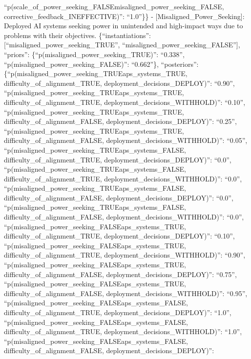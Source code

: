 \documentclass[
  11pt,
  letterpaper,
]{book}
\begin{document}
``p(scale\_of\_power\_seeking\_FALSE\textbar misaligned\_power\_seeking\_FALSE,
corrective\_feedback\_INEFFECTIVE)'': ``1.0''\}\} -
{[}Misaligned\_Power\_Seeking{]}: Deployed AI systems seeking power in
unintended and high-impact ways due to problems with their objectives.
\{``instantiations'': {[}``misaligned\_power\_seeking\_TRUE'',
``misaligned\_power\_seeking\_FALSE''{]}, ``priors'':
\{``p(misaligned\_power\_seeking\_TRUE)'': ``0.338'',
``p(misaligned\_power\_seeking\_FALSE)'': ``0.662''\}, ``posteriors'':
\{``p(misaligned\_power\_seeking\_TRUE\textbar aps\_systems\_TRUE,
difficulty\_of\_alignment\_TRUE, deployment\_decisions\_DEPLOY)'':
``0.90'',
``p(misaligned\_power\_seeking\_TRUE\textbar aps\_systems\_TRUE,
difficulty\_of\_alignment\_TRUE, deployment\_decisions\_WITHHOLD)'':
``0.10'',
``p(misaligned\_power\_seeking\_TRUE\textbar aps\_systems\_TRUE,
difficulty\_of\_alignment\_FALSE, deployment\_decisions\_DEPLOY)'':
``0.25'',
``p(misaligned\_power\_seeking\_TRUE\textbar aps\_systems\_TRUE,
difficulty\_of\_alignment\_FALSE, deployment\_decisions\_WITHHOLD)'':
``0.05'',
``p(misaligned\_power\_seeking\_TRUE\textbar aps\_systems\_FALSE,
difficulty\_of\_alignment\_TRUE, deployment\_decisions\_DEPLOY)'':
``0.0'',
``p(misaligned\_power\_seeking\_TRUE\textbar aps\_systems\_FALSE,
difficulty\_of\_alignment\_TRUE, deployment\_decisions\_WITHHOLD)'':
``0.0'',
``p(misaligned\_power\_seeking\_TRUE\textbar aps\_systems\_FALSE,
difficulty\_of\_alignment\_FALSE, deployment\_decisions\_DEPLOY)'':
``0.0'',
``p(misaligned\_power\_seeking\_TRUE\textbar aps\_systems\_FALSE,
difficulty\_of\_alignment\_FALSE, deployment\_decisions\_WITHHOLD)'':
``0.0'',
``p(misaligned\_power\_seeking\_FALSE\textbar aps\_systems\_TRUE,
difficulty\_of\_alignment\_TRUE, deployment\_decisions\_DEPLOY)'':
``0.10'',
``p(misaligned\_power\_seeking\_FALSE\textbar aps\_systems\_TRUE,
difficulty\_of\_alignment\_TRUE, deployment\_decisions\_WITHHOLD)'':
``0.90'',
``p(misaligned\_power\_seeking\_FALSE\textbar aps\_systems\_TRUE,
difficulty\_of\_alignment\_FALSE, deployment\_decisions\_DEPLOY)'':
``0.75'',
``p(misaligned\_power\_seeking\_FALSE\textbar aps\_systems\_TRUE,
difficulty\_of\_alignment\_FALSE, deployment\_decisions\_WITHHOLD)'':
``0.95'',
``p(misaligned\_power\_seeking\_FALSE\textbar aps\_systems\_FALSE,
difficulty\_of\_alignment\_TRUE, deployment\_decisions\_DEPLOY)'':
``1.0'',
``p(misaligned\_power\_seeking\_FALSE\textbar aps\_systems\_FALSE,
difficulty\_of\_alignment\_TRUE, deployment\_decisions\_WITHHOLD)'':
``1.0'',
``p(misaligned\_power\_seeking\_FALSE\textbar aps\_systems\_FALSE,
difficulty\_of\_alignment\_FALSE, deployment\_decisions\_DEPLOY)'':
\end{document}
